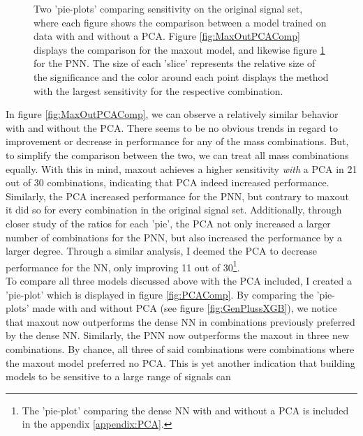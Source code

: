 \begin{figure}
{\begin{subfigure}{.6\textwidth}
        \vspace{-.75cm}
        \caption{}
        \label{fig:PNNPCAComp}
    \end{subfigure}
    }
    \caption[Two 'pie-plots 'comparing the sensitivity on the original signal set, where each figure shows the comparison between a model (maxout and \acs{PNN}) training on data 
    with and without a \acs{PCA}.]{Two 'pie-plots' comparing sensitivity on the original signal set, where each figure shows the comparison between a model trained on data 
    with and without a \ac{PCA}. Figure \ref{fig:MaxOutPCAComp} displays the comparison for the maxout model, and likewise figure \ref{fig:PNNPCAComp} 
    for the \ac{PNN}. The size of each 'slice' represents the relative size of the significance and the color around each 
    point displays the method with the largest sensitivity for the respective combination.}
    \label{fig:PCAComp2}
\end{figure}
In figure \ref{fig:MaxOutPCAComp}, we can observe a relatively similar behavior with and without the \ac{PCA}. There seems to be no obvious trends in regard 
to improvement or decrease in performance for any of the mass combinations. But, to simplify the comparison between the two, we can treat all mass combinations
equally. With this in mind, maxout achieves a higher sensitivity \emph{with} a \ac{PCA} in 21 out of 30 combinations, indicating that \ac{PCA} indeed increased performance.
Similarly, the \ac{PCA} increased performance for the \ac{PNN}, but contrary to maxout it did so for every combination in the original signal set. Additionally,
through closer study of the ratios for each 'pie', the \ac{PCA} not only increased a larger number of combinations for the \ac{PNN}, but also increased the performance
by a larger degree. Through a similar analysis, I deemed the \ac{PCA} to decrease performance for the \ac{NN}, only improving 11 out of 30\footnote{The 'pie-plot' comparing the 
dense \ac{NN} with and without a \ac{PCA} is included in the appendix \ref{appendix:PCA}.}. 
\\
To compare all three models discussed above with the \ac{PCA} included, I created a 'pie-plot' which is displayed in figure \ref{fig:PCAComp}. By comparing 
the 'pie-plots' made with and without \ac{PCA} (see figure \ref{fig:GenPlussXGB}), we notice that maxout now outperforms the dense \ac{NN} in combinations 
previously preferred by the dense \ac{NN}. Similarly, the \ac{PNN} now outperforms the maxout in three new combinations. By chance, all three of said combinations 
were combinations where the maxout model preferred no \ac{PCA}. This is yet another indication that building models to be sensitive to a large range of signals can 
